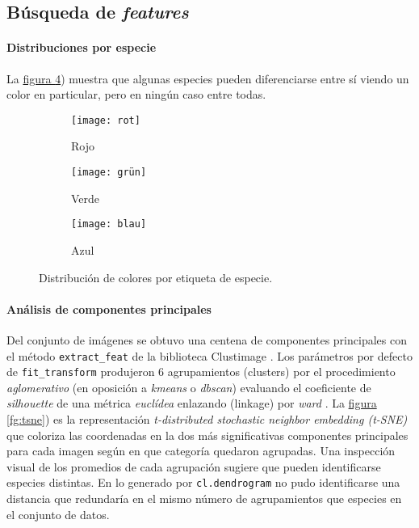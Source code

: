 \documentclass{article}
\begin{document}
\subsection{Búsqueda de \emph{features}}

\paragraph{Distribuciones por especie} La \hyperref[fg:promediosBox]{figura \ref*{fg:promediosBox}}) muestra que algunas especies pueden diferenciarse entre sí viendo un color en particular, pero en ningún caso entre todas.

\begin{figure}
	\centering
	\begin{subfigure}[b]{0.32\textwidth}
		\texttt{[image: rot]}
		\caption{Rojo}
		\label{fg:rot}
	\end{subfigure}
	\begin{subfigure}[b]{0.32\textwidth}
		\texttt{[image: grün]}
		\caption{Verde}
		\label{fg:grün}
	\end{subfigure}
	\begin{subfigure}[b]{0.32\textwidth}
		\texttt{[image: blau]}
		\caption{Azul}
		\label{fg:blau}
	\end{subfigure}
	\caption{Distribución de colores por etiqueta de especie.}
	\label{fg:promediosBox}
\end{figure}




\paragraph{Análisis de componentes principales}
Del conjunto de imágenes se obtuvo una centena de componentes principales con el método \verb'extract_feat' de la biblioteca Clustimage \cite{taskesen_pca_2020}.
Los parámetros por defecto de \verb`fit_transform` produjeron 6 agrupamientos (clusters) por el procedimiento \emph{aglomerativo} (en oposición a \emph{kmeans} o \emph{dbscan}) evaluando el coeficiente de \emph{silhouette} de una métrica \emph{euclídea} enlazando (linkage) por \emph{ward} \cite{noauthor_api_nodate}.
La \hyperref[fg:tsne]{figura \ref*{fg:tsne}}) es la representación \emph{t-distributed stochastic neighbor embedding (t-SNE)} que coloriza las coordenadas en la dos más significativas componentes principales para cada imagen según en que categoría quedaron agrupadas.
Una inspección visual de los promedios de cada agrupación sugiere que pueden identificarse especies distintas.
En lo generado por \verb'cl.dendrogram' no pudo identificarse una distancia que redundaría en el mismo número de agrupamientos que especies en el conjunto de datos.
\end{document}
